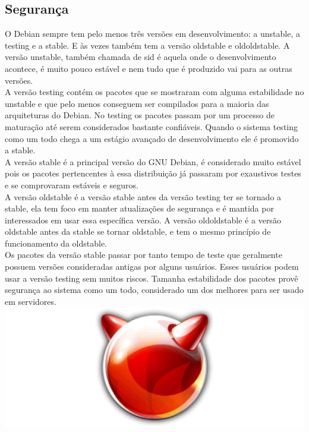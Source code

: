 \documentclass[conference]{IEEEtran}
\begin{document}
\subsection{Segurança}\label{sec:LinuxSec}
O Debian sempre tem pelo menos três versões em desenvolvimento: a unstable, a testing e a stable. E às vezes também tem a versão oldstable e oldoldstable. A versão unstable, também chamada de sid é aquela onde o desenvolvimento acontece, é muito pouco estável e nem tudo que é produzido vai para as outras versões.\\

A versão testing contém os pacotes que se mostraram com alguma estabilidade no unstable e que pelo menos conseguem ser compilados para a maioria das arquiteturas do Debian. No testing os pacotes passam por um processo de maturação até serem considerados bastante confiáveis. Quando o sistema testing como um todo chega a um estágio avançado de desenvolvimento ele é promovido a stable.\\

A versão stable é a principal versão do GNU Debian, é considerado muito estável pois os pacotes pertencentes à essa distribuição já passaram por exaustivos testes e se comprovaram estáveis e seguros.\\

A versão oldstable é a versão stable antes da versão testing ter se tornado a stable, ela tem foco em manter atualizações de segurança e é mantida por interessados em usar essa específica versão. A versão oldoldstable é a versão oldstable antes da stable se tornar oldstable, e tem o mesmo princípio de funcionamento da oldstable.\\

Os pacotes da versão stable passar por tanto tempo de teste que geralmente possuem versões consideradas antigas por alguns usuários. Esses usuários podem usar a versão testing sem muitos riscos. Tamanha estabilidade dos pacotes provê segurança ao sistema como um todo, considerado um dos melhores para ser usado em servidores.\\


\includegraphics[scale = 0.2]{FreeBSD.png}\\
\end{document}
